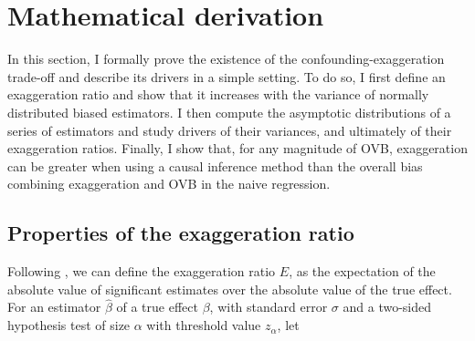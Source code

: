 \documentclass[usletter, 12pt]{article}
\begin{document}


	
	\section{Mathematical derivation} \label{maths}
						
		In this section, I formally prove the existence of the confounding-exaggeration trade-off  and describe its drivers in a simple setting. %
		To do so, I first define an exaggeration ratio  and show that it increases with the variance of normally distributed biased estimators. I then compute the asymptotic distributions of a series of estimators and study drivers of their variances, and ultimately of their exaggeration ratios. Finally, I show that, for any magnitude of OVB, exaggeration can be greater when using a causal inference method than the overall bias combining exaggeration and OVB in the naive regression.
		
		
		\subsection{Properties of the exaggeration ratio}\label{general_exagg}
		
			Following  \cite{gelman_beyond_2014}, we can define the exaggeration ratio $E$, as the expectation of the absolute value of significant estimates over the absolute value of the true effect. For an estimator $\hat{\beta}$ of a true effect $\beta$, with standard error $\sigma$ and a two-sided hypothesis test of size $\alpha$ with threshold value $z_{\alpha}$, let
			
		 
\end{document}

